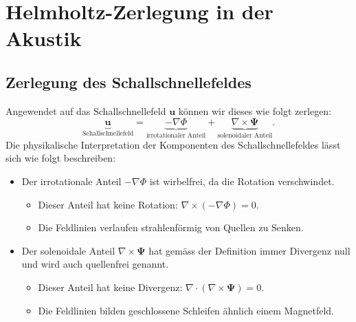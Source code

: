 %
%
%
%
\section{Helmholtz-Zerlegung in der Akustik
\label{helmholtz:section:Helmholtz_Zerlegung_Akustik}}


\subsection{Zerlegung des Schallschnellefeldes
\label{helmholtz:subsection:Zerlegung_Schallschnelle}}
Angewendet auf das Schallschnellefeld $\boldsymbol{u}$ können wir
dieses wie folgt zerlegen:
\begin{equation*}
\underbrace{\boldsymbol{u}}_{\displaystyle\text{Schallschnellefeld}}
=
\underbrace{-\nabla \Phi}_{\displaystyle\text{irrotationaler~Anteil}}
+
\underbrace{\nabla \times \boldsymbol{\Psi}}_{\displaystyle\text{solenoidaler~Anteil}}.
\end{equation*}
Die physikalische Interpretation der Komponenten des Schallschnellefeldes
lässt sich wie folgt beschreiben:
 
\begin{itemize}
\item Der irrotationale Anteil $-\nabla \Phi$ ist wirbelfrei, da die
Rotation verschwindet.
\begin{itemize}
\item Dieser Anteil hat keine Rotation: $\nabla \times (-\nabla \Phi) = 0$.
\item Die Feldlinien verlaufen strahlenförmig von Quellen zu Senken.
\end{itemize}
 
\item Der solenoidale Anteil $\nabla \times \boldsymbol{\Psi}$ hat gemäss
der Definition immer Divergenz null und wird auch quellenfrei genannt.
\begin{itemize}
\item Dieser Anteil hat keine Divergenz:
$\nabla \cdot (\nabla \times \boldsymbol{\Psi}) = 0$.
\item Die Feldlinien bilden geschlossene Schleifen ähnlich einem Magnetfeld.
\end{itemize}
\end{itemize}

